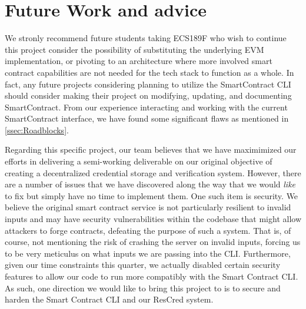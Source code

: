 \section{Future Work and advice}

We stronly recommend future students taking ECS189F who wish to continue this project consider the possibility of substituting the underlying EVM implementation, or pivoting to an architecture where more involved smart contract capabilities are not needed for the tech stack to function as a whole.
In fact, any future projects considering planning to utilize the SmartContract CLI should consider
making their project on modifying, updating, and documenting SmartContract.
From our experience interacting and working with the current SmartContract interface, we have found
some significant flaws as mentioned in \autoref{ssec:Roadblocks}.

Regarding this specific project, our team believes that we have maximimized our efforts in
delivering a semi-working deliverable on our original objective of creating a decentralized
credential storage and verification system. However, there are a number of issues that we have
discovered along the way that we would \textit{like} to fix but simply have no time to implement
them. One such item is security. We believe the original smart contract service is not particularly
resilient to invalid inputs and may have security vulnerabilities within the codebase that might
allow attackers to forge contracts, defeating the purpose of such a system. That is, of course, not
mentioning the risk of crashing the server on invalid inputs, forcing us to be very meticulus on
what inputs we are passing into the CLI. Furthermore, given our
time constraints this quarter, we actually disabled certain security features to allow our code to
run more compatibly with the Smart Contract CLI. As such, one direction we would like to bring this
project to is to secure and harden the Smart Contract CLI and our ResCred system. 
